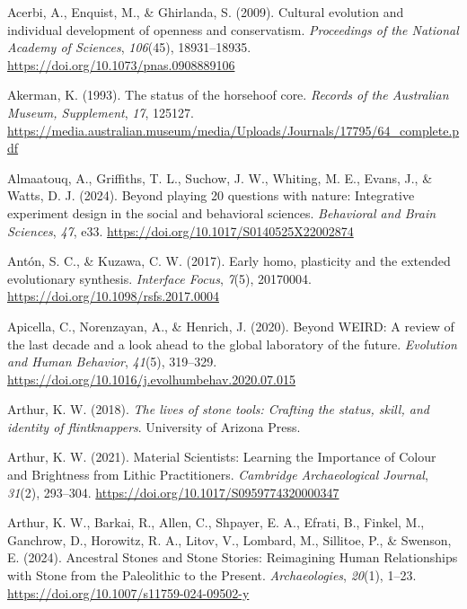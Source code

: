 \documentclass[
  11pt,
  letterpaper,
  DIV=11,
  numbers=noendperiod]{scrartcl}
\newlength{\cslhangindent}
\newenvironment{CSLReferences}[2] %
 {\begin{list}{}{%
  \setlength{\itemindent}{0pt}
  \setlength{\leftmargin}{0pt}
  \setlength{\parsep}{0pt}
  \ifodd #1
   \setlength{\leftmargin}{\cslhangindent}
   \setlength{\itemindent}{-1\cslhangindent}
  \fi
  \setlength{\itemsep}{#2\baselineskip}}}
 {\end{list}}
\begin{document}
\label{refs}
\begin{CSLReferences}{1}{0}
Acerbi, A., Enquist, M., \& Ghirlanda, S. (2009). Cultural evolution and
individual development of openness and conservatism. \emph{Proceedings
of the National Academy of Sciences}, \emph{106}(45), 18931--18935.
\url{https://doi.org/10.1073/pnas.0908889106}

Akerman, K. (1993). The status of the horsehoof core. \emph{Records of
the Australian Museum, Supplement}, \emph{17}, 125127.
\url{https://media.australian.museum/media/Uploads/Journals/17795/64_complete.pdf}

Almaatouq, A., Griffiths, T. L., Suchow, J. W., Whiting, M. E., Evans,
J., \& Watts, D. J. (2024). Beyond playing 20 questions with nature:
Integrative experiment design in the social and behavioral sciences.
\emph{Behavioral and Brain Sciences}, \emph{47}, e33.
\url{https://doi.org/10.1017/S0140525X22002874}

Antón, S. C., \& Kuzawa, C. W. (2017). Early homo, plasticity and the
extended evolutionary synthesis. \emph{Interface Focus}, \emph{7}(5),
20170004. \url{https://doi.org/10.1098/rsfs.2017.0004}

Apicella, C., Norenzayan, A., \& Henrich, J. (2020). Beyond WEIRD: A
review of the last decade and a look ahead to the global laboratory of
the future. \emph{Evolution and Human Behavior}, \emph{41}(5), 319--329.
\url{https://doi.org/10.1016/j.evolhumbehav.2020.07.015}

Arthur, K. W. (2018). \emph{The lives of stone tools: Crafting the
status, skill, and identity of flintknappers}. University of Arizona
Press.

Arthur, K. W. (2021). Material Scientists: Learning the Importance of
Colour and Brightness from Lithic Practitioners. \emph{Cambridge
Archaeological Journal}, \emph{31}(2), 293--304.
\url{https://doi.org/10.1017/S0959774320000347}

Arthur, K. W., Barkai, R., Allen, C., Shpayer, E. A., Efrati, B.,
Finkel, M., Ganchrow, D., Horowitz, R. A., Litov, V., Lombard, M.,
Sillitoe, P., \& Swenson, E. (2024). Ancestral Stones and Stone Stories:
Reimagining Human Relationships with Stone from the Paleolithic to the
Present. \emph{Archaeologies}, \emph{20}(1), 1--23.
\url{https://doi.org/10.1007/s11759-024-09502-y}


\end{CSLReferences}
\end{document}
